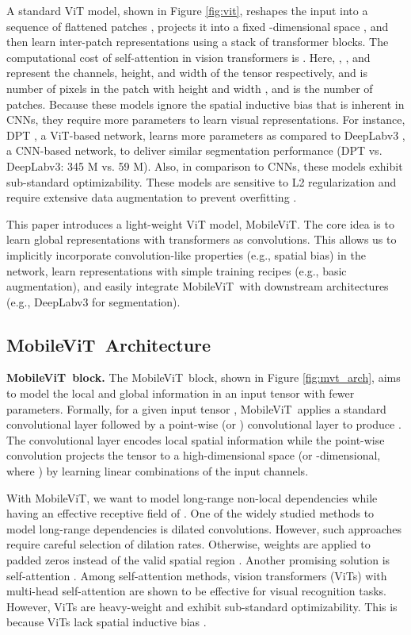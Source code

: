 \documentclass[preprint]{article} \usepackage{iclr2022_conference,times}
\newcommand{\arch}{MobileViT}
\begin{document}
A standard ViT model, shown in Figure \ref{fig:vit}, reshapes the input  into a sequence of flattened patches , projects it into a fixed -dimensional space , and then learn inter-patch representations using a stack of  transformer blocks. The computational cost of self-attention in vision transformers is . Here, , , and  represent the channels, height, and width of the tensor respectively, and  is number of pixels in the patch with height  and width , and  is the number of patches. Because these models ignore the spatial inductive bias that is inherent in CNNs, they require more parameters to learn visual representations. For instance, DPT \citep{dosovitskiy2020image}, a ViT-based network, learns  more parameters as compared to DeepLabv3 \citep{chen2017rethinking}, a CNN-based network, to deliver similar segmentation performance (DPT vs. DeepLabv3: 345 M vs. 59 M). Also, in comparison to CNNs, these models exhibit sub-standard optimizability. These models are sensitive to L2 regularization and require extensive data augmentation to prevent overfitting \citep{touvron2021training, xiao2021early}. 

This paper introduces a light-weight ViT model, \arch. The core idea is to learn global representations with transformers as convolutions. This allows us to implicitly incorporate convolution-like properties (e.g., spatial bias) in the network, learn representations with simple training recipes (e.g., basic augmentation), and easily integrate \arch~with downstream architectures (e.g., DeepLabv3 for segmentation).

\subsection{\arch~Architecture}
\label{ssec:mobilevit_arch}

\textbf{\arch~block.} The \arch~block, shown in Figure \ref{fig:mvt_arch}, aims to model the local and global information in an input tensor with fewer parameters. Formally, for a given input tensor , \arch~applies a  standard convolutional layer followed by a point-wise (or ) convolutional layer to produce . The  convolutional layer encodes local spatial information while the point-wise convolution projects the tensor to a high-dimensional space (or -dimensional, where ) by learning linear combinations of the input channels. 

With \arch, we want to model long-range non-local dependencies while having an effective receptive field of . One of the widely studied methods to model long-range dependencies is dilated convolutions. However, such approaches require careful selection of dilation rates. Otherwise, weights are applied to padded zeros instead of the valid spatial region \citep{yu2015multi, chen2017rethinking, mehta2018espnet}. Another promising solution is self-attention \citep{wang2018non, ramachandran2019stand, bello2019attention, dosovitskiy2020image}. Among self-attention methods, vision transformers (ViTs) with multi-head self-attention are shown to be effective for visual recognition tasks. However, ViTs are heavy-weight and exhibit sub-standard optimizability. This is because ViTs lack spatial inductive bias \citep{xiao2021early, graham2021levit}. 
\end{document}
